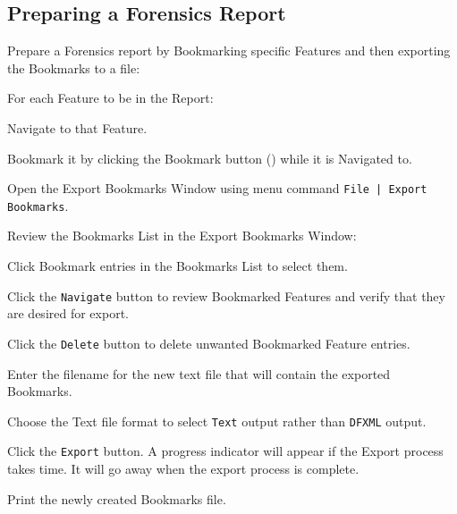 \documentclass[10pt,twoside]{article}
\newcommand{\button}[1]{(\raisebox{-1.20mm}{\texttt{[image: ./graphics/\#1]}})}
\begin{document}
\subsection{Preparing a Forensics Report}
Prepare a Forensics report by Bookmarking specific Features
and then exporting the Bookmarks to a file:
\begin{compactenum}
\item For each Feature to be in the Report:
\begin{compactenum}
\item Navigate to that Feature.
\item Bookmark it by clicking the Bookmark button \button{Bookmark}
while it is Navigated to.
\end{compactenum}
\item Open the Export Bookmarks Window using menu command \texttt{File | Export Bookmarks}.
\item Review the Bookmarks List in the Export Bookmarks Window:
\begin{compactenum}
\item Click Bookmark entries in the Bookmarks List to select them.
\item Click the \texttt{Navigate} button to review Bookmarked Features
and verify that they are desired for export.
\item Click the \texttt{Delete} button to delete unwanted Bookmarked Feature entries.
\end{compactenum}
\item Enter the filename for the new text file that will contain the exported Bookmarks.
\item Choose the Text file format to select \texttt{Text} output rather than \texttt{DFXML} output.
\item Click the \texttt{Export} button.
A progress indicator will appear if the Export process takes time.
It will go away when the export process is complete.
\item Print the newly created Bookmarks file.
\end{compactenum}
\end{document}
